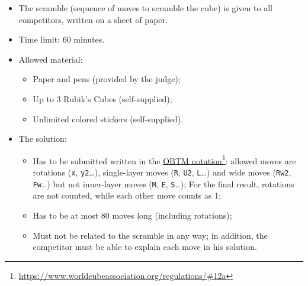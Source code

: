 \documentclass[11pt,a4paper]{book}
\newcommand{\p}{\textquotesingle}
\newcommand{\m}{\texttt}
\begin{document}
\begin{itemize}
\item The scramble (sequence of moves to scramble the cube) is given to all competitors, written on a sheet of paper.
\item Time limit: 60 minutes.
\item Allowed material:
\begin{itemize}
\item Paper and pens (provided by the judge);
\item Up to 3 Rubik's Cubes (self-supplied);
\item Unlimited colored stickers (self-supplied).
\end{itemize}
\item The solution:
\begin{itemize}
\item Has to be submitted written in the \href{https://www.worldcubeassociation.org/regulations/\#12a}{OBTM notation}\footnote{\url{https://www.worldcubeassociation.org/regulations/\#12a}}: allowed moves are rotations (\m x, \m{y2}\dots), single-layer moves (\m{R}, \m{U2}, \m {L\p}\dots) and wide moves (\m{Rw2}, \m{Fw\p}\dots) but not inner-layer moves (\m M, \m E, \m S\dots); For the final result, rotations are not counted, while each other move counts as 1;
\item Has to be at most 80 moves long (including rotations);
\item Must not be related to the scramble in any way; in addition, the competitor must be able to explain each move in his solution.
\end{itemize}
\end{itemize}
\end{document}
